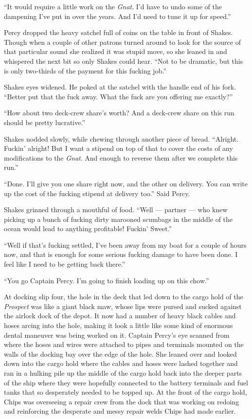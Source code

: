 \documentclass[]{scrbook}
\begin{document}
``It would require a little work on the \emph{Gnat}. I'd have to undo
some of the dampening I've put in over the years. And I'd need to tune
it up for speed.''

Percy dropped the heavy satchel full of coins on the table in front of
Shakes. Though when a couple of other patrons turned around to look for
the source of that particular sound she realized it was stupid move, so
she leaned in and whispered the next bit so only Shakes could hear.
``Not to be dramatic, but this is only two-thirds of the payment for
this fucking job.''

Shakes eyes widened. He poked at the satchel with the handle end of his
fork. ``Better put that the fuck away. What the fuck are you offering me
exactly?''

``How about two deck-crew share's worth? And a deck-crew share on this
run should be pretty lucrative.''

Shakes nodded slowly, while chewing through another piece of bread.
``Alright. Fuckin' alright! But I want a stipend on top of that to cover
the costs of any modifications to the \emph{Gnat}. And enough to reverse
them after we complete this run.''

``Done. I'll give you one share right now, and the other on delivery.
You can write up the cost of the fucking stipend at delivery too.'' Said
Percy.

Shakes grinned through a mouthful of food. ``Well --- partner --- who
knew picking up a bunch of fucking dirty marooned scumbags in the middle
of the ocean would lead to anything profitable! Fuckin' Sweet.''

``Well if that's fucking settled, I've been away from my boat for a
couple of hours now, and that is enough for some serious fucking damage
to have been done. I feel like I need to be getting back there.''

``You go Captain Percy. I'm going to finish loading up on this chow.''

At docking slip four, the hole in the deck that led down to the cargo
hold of the \emph{Prospect} was like a giant black maw, whose lips were
pursed and sucked against the airlock dock of the depot. It now had a
number of heavy black cables and hoses arcing into the hole, making it
look a little like some kind of enormous dental maneuver was being
worked on it. Captain Percy's eye scanned from where the hoses and wires
were attached to pipes and terminals mounted on the walls of the docking
bay over the edge of the hole. She leaned over and looked down into the
cargo hold where the cables and hoses were lashed together and ran in a
hulking pile up the middle of the cargo hold back into the deeper parts
of the ship where they were hopefully connected to the battery terminals
and fuel tanks that so desperately needed to be topped up. At the front
of the cargo hold, Chips was overseeing a repair crew from the dock that
was working on redoing and reinforcing the desperate and messy repair
welds Chips had made earlier.
\end{document}
